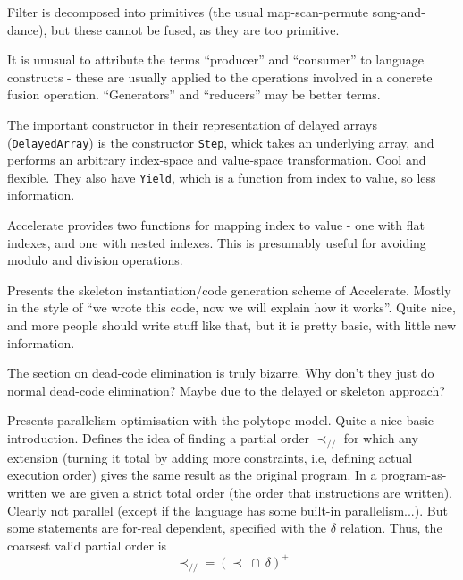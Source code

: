 \documentclass[a4paper, oneside, final]{memoir}
\begin{document}
Filter is decomposed into primitives (the usual map-scan-permute
song-and-dance), but these cannot be fused, as they are too primitive.

It is unusual to attribute the terms ``producer'' and ``consumer'' to
language constructs - these are usually applied to the operations
involved in a concrete fusion operation.  ``Generators'' and
``reducers'' may be better terms.

The important constructor in their representation of delayed arrays
(\texttt{DelayedArray}) is the constructor \texttt{Step}, whick takes
an underlying array, and performs an arbitrary index-space and
value-space transformation.  Cool and flexible.  They also have
\texttt{Yield}, which is a function from index to value, so less
information.

Accelerate provides two functions for mapping index to value - one
with flat indexes, and one with nested indexes.  This is presumably
useful for avoiding modulo and division operations.

\begin{quote}
\end{quote}

Presents the skeleton instantiation/code generation scheme of
Accelerate.  Mostly in the style of ``we wrote this code, now we will
explain how it works''.  Quite nice, and more people should write
stuff like that, but it is pretty basic, with little new information.

The section on dead-code elimination is truly bizarre.  Why don't they
just do normal dead-code elimination?  Maybe due to the delayed or
skeleton approach?

\begin{quote}
\end{quote}

Presents parallelism optimisation with the polytope model.  Quite a
nice basic introduction.  Defines the idea of finding a partial order
$\prec_{//}$ for which any extension (turning it total by adding more
constraints, i.e, defining actual execution order) gives the same
result as the original program.  In a program-as-written we are given
a strict total order (the order that instructions are written).
Clearly not parallel (except if the language has some built-in
parallelism...).  But some statements are for-real dependent,
specified with the $\delta$ relation.  Thus, the coarsest valid
partial order is
\[
\prec_{//} = (\prec\ \cap\ \delta)^{+}
\]
\end{document}
